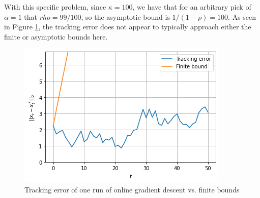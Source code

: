 \documentclass[12pt]{article}
\begin{document}
\begin{enumerate}
        With this specific problem, since $\kappa = 100$, we have that for an arbitrary pick of $\alpha = 1$ that $rho=99/100$, so the asymptotic bound is $1/(1-\rho) = 100$. As seen in Figure \ref{fig:p1ii}, the tracking error does not appear to typically approach either the finite or asymptotic bounds here.

        \begin{figure}[h]
        \begin{center}
            \includegraphics[scale=0.5]{figures/hw4-p1-ii.png}
        \end{center}
        \caption{Tracking error of one run of online gradient descent vs. finite bounds}
        \label{fig:p1ii}
        \end{figure}
        

\end{enumerate}
\end{document}
